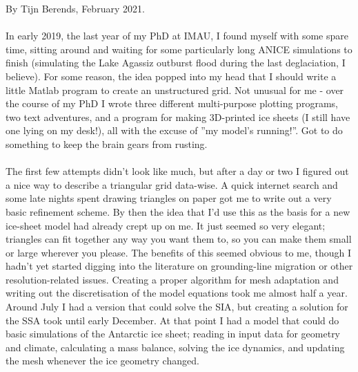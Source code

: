 \documentclass{article}
\begin{document}
By Tijn Berends, February 2021.\\
\\
In early 2019, the last year of my PhD at IMAU, I found myself with some spare time, sitting around and waiting for some particularly long ANICE simulations to finish (simulating the Lake Agassiz outburst flood during the last deglaciation, I believe). For some reason, the idea popped into my head that I should write a little Matlab program to create an unstructured grid. Not unusual for me - over the course of my PhD I wrote three different multi-purpose plotting programs, two text adventures, and a program for making 3D-printed ice sheets (I still have one lying on my desk!), all with the excuse of ''my model's running!''. Got to do something to keep the brain gears from rusting.\\
\\
The first few attempts didn't look like much, but after a day or two I figured out a nice way to describe a triangular grid data-wise. A quick internet search and some late nights spent drawing triangles on paper got me to write out a very basic refinement scheme. By then the idea that I'd use this as the basis for a new ice-sheet model had already crept up on me. It just seemed so very elegant; triangles can fit together any way you want them to, so you can make them small or large wherever you please. The benefits of this seemed obvious to me, though I hadn't yet started digging into the literature on grounding-line migration or other resolution-related issues. Creating a proper algorithm for mesh adaptation and writing out the discretisation of the model equations took me almost half a year. Around July I had a version that could solve the SIA, but creating a solution for the SSA took until early December. At that point I had a model that could do basic simulations of the Antarctic ice sheet; reading in input data for geometry and climate, calculating a mass balance, solving the ice dynamics, and updating the mesh whenever the ice geometry changed.\\
\\
\end{document}
